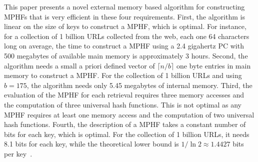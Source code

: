 \enlargethispage{2\baselineskip}
This paper presents a novel external memory based algorithm for constructing MPHFs that 
is very efficient in these four requirements.
First, the algorithm is linear on the size of keys to construct a MPHF,
which is optimal.
For instance, for a collection of 1 billion URLs 
collected from the web, each one 64 characters long on average, the time to construct a
MPHF using a 2.4 gigahertz PC with 500 megabytes of available main memory
is approximately 3 hours.
Second, the algorithm needs a small a priori defined vector of $\lceil n/b \rceil$
one byte entries in main memory to construct a MPHF.
For the collection of 1 billion URLs and using $b=175$, the algorithm needs only
5.45 megabytes of internal memory.
Third, the evaluation of the MPHF for each retrieval requires three memory accesses and
the computation of three universal hash functions.
This is not optimal as any MPHF requires at least one memory access and the computation
of two universal hash functions.
Fourth, the description of a MPHF takes a constant number of bits for each key, which is optimal.
For the collection of 1 billion URLs, it needs 8.1 bits for each key,
while the theoretical lower bound is $1/\ln2 \approx 1.4427$ bits per 
key~\cite{m84}.

